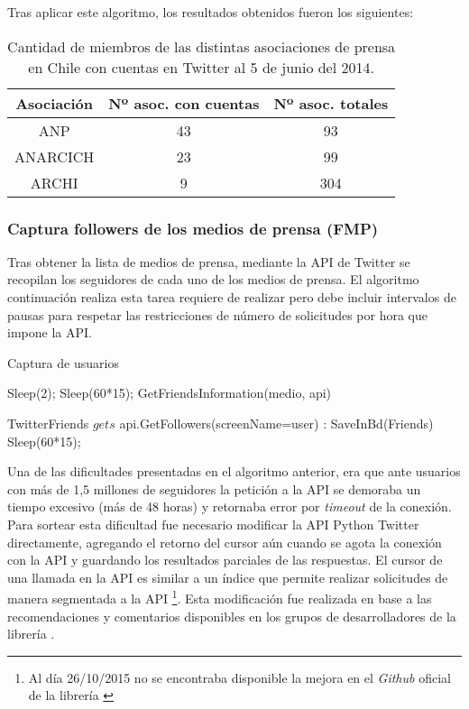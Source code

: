 Tras aplicar este algoritmo, los resultados obtenidos fueron los siguientes:

\begin{table}[H]
	\centering
	\begin{tabular}{|c|c|c|}
		\hline
		Asociación & Nº asoc. con cuentas & Nº asoc. totales \\ \hline
		ANP & 43 & 93 \\ \hline
		ANARCICH & 23 & 99 \\ \hline
		ARCHI & 9 & 304 \\ \hline
	\end{tabular}
	\caption {Cantidad de miembros de las distintas asociaciones de prensa en Chile con cuentas en Twitter al 5 de junio del 2014.}
\end{table}


\subsubsection{Captura followers de los medios de prensa (FMP)}

Tras obtener la lista de medios de prensa, mediante la API de Twitter se recopilan los seguidores de cada uno de los medios de prensa. El algoritmo continuación realiza esta tarea requiere de realizar pero debe incluir intervalos de pausas para respetar las restricciones de número de solicitudes por hora que impone la API.

\begin{algorithm}[H]
	\caption{Captura de usuarios}\label{capturaUsuarios}
	\begin{algorithmic}[1]
		\State Sleep(2);
		\Else
		\State Sleep(60*15);
		\State GetFriendsInformation(medio, api)
		\EndIf
		\EndFor
		\EndFunction
		
		\State TwitterFriends $gets$ api.GetFollowers(screenName=user)
		:
		\State SaveInBd(Friends)
		\EndFor
		\Else
		\State Sleep(60*15);
		\EndIf
		\EndFunction
		
	\end{algorithmic}
\end{algorithm}

Una de las dificultades presentadas en el algoritmo anterior, era que ante usuarios con más de 1,5 millones de seguidores la petición a la API se demoraba un tiempo excesivo (más de 48 horas) y retornaba error por \emph{timeout} de la conexión. Para sortear esta dificultad fue necesario modificar la API Python Twitter directamente, agregando el retorno del cursor aún cuando se agota la conexión con la API y guardando los resultados parciales de las respuestas. El cursor de una llamada en la API es similar a un índice que permite realizar solicitudes de manera segmentada a la API \footnote{ Al día 26/10/2015 no se encontraba disponible la mejora en el \emph{Github} oficial de la librería \cite{pythonTwitterGithub} }. Esta modificación fue realizada en base a las recomendaciones y comentarios disponibles en los grupos de desarrolladores de la librería \cite{pythonTwitterCode} \cite{pythonTwitterGithub}. 

